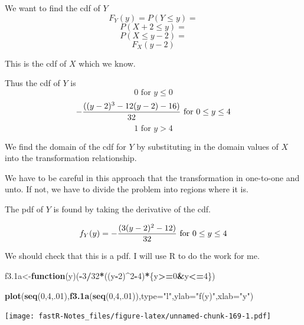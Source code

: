 \documentclass[]{book}
\newenvironment{Shaded}{\begin{snugshade}}{\end{snugshade}}
\newcommand{\KeywordTok}[1]{\textcolor[rgb]{0.13,0.29,0.53}{\textbf{#1}}}
\newcommand{\DataTypeTok}[1]{\textcolor[rgb]{0.13,0.29,0.53}{#1}}
\newcommand{\DecValTok}[1]{\textcolor[rgb]{0.00,0.00,0.81}{#1}}
\newcommand{\StringTok}[1]{\textcolor[rgb]{0.31,0.60,0.02}{#1}}
\newcommand{\ControlFlowTok}[1]{\textcolor[rgb]{0.13,0.29,0.53}{\textbf{#1}}}
\newcommand{\OperatorTok}[1]{\textcolor[rgb]{0.81,0.36,0.00}{\textbf{#1}}}
\newcommand{\NormalTok}[1]{#1}
\theoremstyle{definition}
\theoremstyle{definition}
\theoremstyle{definition}
\theoremstyle{remark}
\begin{document}
We want to find the cdf of \(Y\) \[F_{Y}(y)=P(Y \leq y)=\]
\[P(X+2 \leq y)=\] \[P(X \leq y-2)=\] \[F_{X}(y-2)\]

This is the cdf of \(X\) which we know.

Thus the cdf of \(Y\) is \[0 \mbox{ for }y \leq 0\]
\[-{((y-2)^3-12(y-2)-16) \over 32} \mbox{ for } 0 \leq y \leq 4\]
\[1 \mbox{ for } y>4\]

We find the domain of the cdf for \(Y\) by substituting in the domain
values of \(X\) into the transformation relationship.

We have to be careful in this approach that the transformation in
one-to-one and unto. If not, we have to divide the problem into regions
where it is.

The pdf of \(Y\) is found by taking the derivative of the cdf.

\[f_{Y}(y)=-{(3(y-2)^2-12) \over 32} \mbox{ for } 0 \leq y \leq 4\]

We should check that this is a pdf. I will use R to do the work for me.

\begin{Shaded}
\begin{Highlighting}[]
\NormalTok{f3.1a<-}\ControlFlowTok{function}\NormalTok{(y)(}\OperatorTok{-}\DecValTok{3}\OperatorTok{/}\DecValTok{32}\OperatorTok{*}\NormalTok{((y}\OperatorTok{-}\DecValTok{2}\NormalTok{)}\OperatorTok{^}\DecValTok{2}\OperatorTok{-}\DecValTok{4}\NormalTok{)}\OperatorTok{*}\NormalTok{\{y}\OperatorTok{>=}\DecValTok{0}\OperatorTok{&}\NormalTok{y}\OperatorTok{<=}\DecValTok{4}\NormalTok{\})}
\end{Highlighting}
\end{Shaded}

\begin{Shaded}
\begin{Highlighting}[]
\KeywordTok{plot}\NormalTok{(}\KeywordTok{seq}\NormalTok{(}\DecValTok{0}\NormalTok{,}\DecValTok{4}\NormalTok{,.}\DecValTok{01}\NormalTok{),}\KeywordTok{f3.1a}\NormalTok{(}\KeywordTok{seq}\NormalTok{(}\DecValTok{0}\NormalTok{,}\DecValTok{4}\NormalTok{,.}\DecValTok{01}\NormalTok{)),}\DataTypeTok{type=}\StringTok{"l"}\NormalTok{,}\DataTypeTok{ylab=}\StringTok{"f(y)"}\NormalTok{,}\DataTypeTok{xlab=}\StringTok{"y"}\NormalTok{)}
\end{Highlighting}
\end{Shaded}

\texttt{[image: fastR-Notes\_files/figure-latex/unnamed-chunk-169-1.pdf]}

\begin{Shaded}
\end{Shaded}
\end{document}
